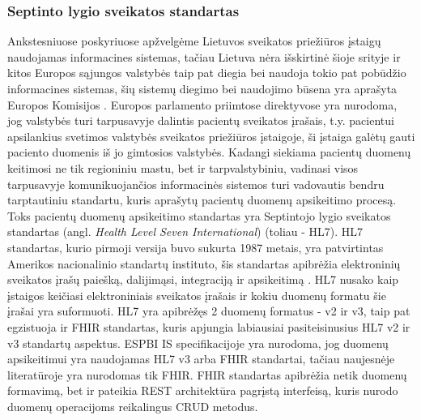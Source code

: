 \subsubsection{Septinto lygio sveikatos standartas}
Ankstesniuose poskyriuose apžvelgėme Lietuvos sveikatos priežiūros įstaigų naudojamas informacines sistemas, tačiau Lietuva nėra išskirtinė šioje srityje ir kitos Europos sąjungos valstybės taip pat diegia bei naudoja tokio pat pobūdžio informacines sistemas, šių sistemų diegimo bei naudojimo būsena yra aprašyta Europos Komisijos \cite{EuroposKomisija}. Europos parlamento priimtose direktyvose \cite{EuroposParlamentas} yra nurodoma, jog valstybės turi tarpusavyje dalintis pacientų sveikatos įrašais, t.y. pacientui apsilankius svetimos valstybės sveikatos priežiūros įstaigoje, ši įstaiga galėtų gauti paciento duomenis iš jo gimtosios valstybės. Kadangi siekiama pacientų duomenų keitimosi ne tik regioniniu mastu, bet ir tarpvalstybiniu, vadinasi visos tarpusavyje komunikuojančios informacinės sistemos turi vadovautis bendru tarptautiniu standartu, kuris aprašytų pacientų duomenų apsikeitimo procesą. Toks pacientų duomenų apsikeitimo standartas yra Septintojo lygio sveikatos standartas (angl. \textit{Health Level Seven International}) (toliau - HL7). HL7 standartas, kurio pirmoji versija buvo sukurta 1987 metais, yra patvirtintas Amerikos nacionalinio standartų instituto, šis standartas apibrėžia elektroninių sveikatos įrašų paiešką, dalijimąsi, integraciją ir apsikeitimą \cite{HL72009}. HL7 nusako kaip įstaigos keičiasi elektroniniais sveikatos įrašais ir kokiu duomenų formatu šie įrašai yra suformuoti. HL7 yra apibrėžęs 2 duomenų formatus - v2 ir v3, taip pat egzistuoja ir FHIR standartas, kuris apjungia labiausiai pasiteisinusius HL7 v2 ir v3 standartų aspektus. ESPBI IS specifikacijoje \cite{Specifikacija} yra nurodoma, jog duomenų apsikeitimui yra naudojamas HL7 v3 arba FHIR standartai, tačiau naujesnėje literatūroje \cite{Registrucentras} yra nurodomas tik FHIR. FHIR standartas apibrėžia netik duomenų formavimą, bet ir pateikia REST architektūra pagrįstą interfeisą, kuris nurodo
duomenų operacijoms reikalingus CRUD metodus.


